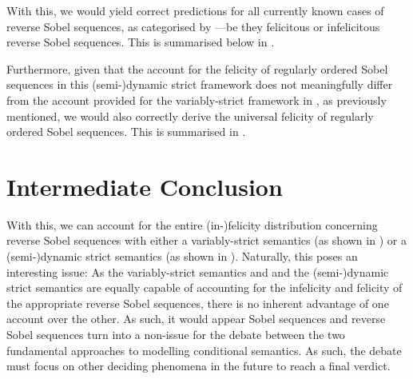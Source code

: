 With this, we would yield correct predictions for all currently known cases of reverse Sobel sequences, as categorised by ---be they felicitous or infelicitous reverse Sobel sequences. This is summarised below in .
\begin{table}[!htb]
\end{table}

\noindent Furthermore, given that the account for the felicity of regularly ordered Sobel sequences in this (semi-)dynamic strict framework does not meaningfully differ from the account provided for the variably-strict framework in , as previously mentioned, we would also correctly derive the universal felicity of regularly ordered Sobel sequences. This is summarised in .
\begin{table}[!htb]
\end{table}\vspace{-10mm}

\section{Intermediate Conclusion}
With this, we can account for the entire (in-)felicity distribution concerning reverse Sobel sequences with either a variably-strict semantics (as shown in ) or a (semi-)dynamic strict semantics (as shown in ). Naturally, this poses an interesting issue: As the variably-strict semantics and and the (semi-)dynamic strict semantics are equally capable of accounting for the infelicity and felicity of the appropriate reverse Sobel sequences, there is no inherent advantage of one account over the other. As such, it would appear Sobel sequences and reverse Sobel sequences turn into a non-issue for the debate between the two fundamental approaches to modelling conditional semantics. As such, the debate must focus on other deciding phenomena in the future to reach a final verdict.
